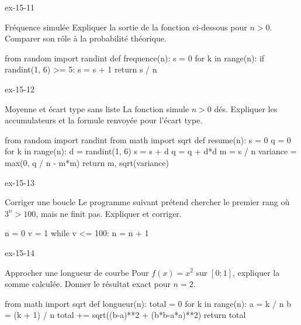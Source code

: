 \clearpage{}
\begin{blocLivre}{ex-15-11}
\begin{exercice}[3]{Fréquence simulée}
Expliquer la sortie de la fonction ci-dessous pour $n>0$. Comparer son rôle à la probabilité théorique.
\begin{python}
from random import randint
def frequence(n):
    s = 0
    for k in range(n):
        if randint(1, 6) >= 5:
            s = s + 1
    return s / n
\end{python}
\end{exercice}
\end{blocLivre}
\begin{blocLivre}{ex-15-12}
\begin{exercice}[3]{Moyenne et écart type sans liste}
La fonction simule $n>0$ dés. Expliquer les accumulateurs et la formule renvoyée pour l’écart type.
\begin{python}
from random import randint
from math import sqrt
def resume(n):
    s = 0
    q = 0
    for k in range(n):
        d = randint(1, 6)
        s = s + d
        q = q + d*d
    m = s / n
    variance = max(0, q / n - m*m)
    return m, sqrt(variance)
\end{python}
\end{exercice}
\end{blocLivre}
\begin{blocLivre}{ex-15-13}
\begin{exercice}[3]{Corriger une boucle}
Le programme suivant prétend chercher le premier rang où $3^n>100$, mais ne finit pas. Expliquer et corriger.
\begin{python}
n = 0
v = 1
while v <= 100:
    n = n + 1
\end{python}
\end{exercice}
\end{blocLivre}
\begin{blocLivre}{ex-15-14}
\begin{exercice}[3]{Approcher une longueur de courbe}
Pour $f(x)=x^2$ sur $[0;1]$, expliquer la somme calculée. Donner le résultat exact pour $n=2$.
\begin{python}
from math import sqrt
def longueur(n):
    total = 0
    for k in range(n):
        a = k / n
        b = (k + 1) / n
        total += sqrt((b-a)**2 + (b*b-a*a)**2)
    return total
\end{python}
\label{fig-ex-15-14}
\end{exercice}
\end{blocLivre}

